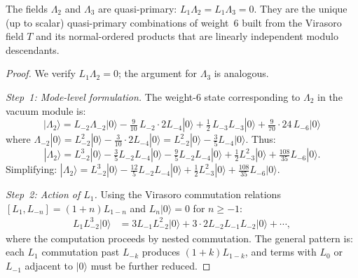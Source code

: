 \begin{proposition}\label{prop:lambda23-quasiprimary}
The fields $\Lambda_2$ and $\Lambda_3$ are quasi-primary:
$L_1\Lambda_2 = L_1\Lambda_3 = 0$.  They are the unique (up to
scalar) quasi-primary combinations of weight~$6$ built from the
Virasoro field $T$ and its normal-ordered products that are linearly
independent modulo descendants.
\end{proposition}

\begin{proof}
We verify $L_1\Lambda_2 = 0$; the argument for $\Lambda_3$ is
analogous.

\emph{Step~1: Mode-level formulation.}
The weight-6 state corresponding to $\Lambda_2$ in the vacuum
module is:
\[
|\Lambda_2\rangle = L_{-2}\Lambda_{-2}|0\rangle
  - \tfrac{9}{10}\, L_{-2}\cdot 2L_{-4}|0\rangle
  + \tfrac{1}{2}\, L_{-3}L_{-3}|0\rangle
  + \tfrac{9}{70}\cdot 24\, L_{-6}|0\rangle
\]
where $\Lambda_{-2}|0\rangle = L_{-2}^2|0\rangle
- \frac{3}{10}\cdot 2L_{-4}|0\rangle = L_{-2}^2|0\rangle
- \frac{3}{5}L_{-4}|0\rangle$.
Thus:
\[
|\Lambda_2\rangle = L_{-2}^3|0\rangle - \tfrac{3}{5}L_{-2}L_{-4}|0\rangle
  - \tfrac{9}{5}L_{-2}L_{-4}|0\rangle
  + \tfrac{1}{2}L_{-3}^2|0\rangle + \tfrac{108}{35}L_{-6}|0\rangle.
\]
Simplifying: $|\Lambda_2\rangle = L_{-2}^3|0\rangle
  - \tfrac{12}{5}L_{-2}L_{-4}|0\rangle + \tfrac{1}{2}L_{-3}^2|0\rangle
  + \tfrac{108}{35}L_{-6}|0\rangle$.

\emph{Step~2: Action of $L_1$.}
Using the Virasoro commutation relations
$[L_1, L_{-n}] = (1+n)L_{1-n}$ and
$L_n|0\rangle = 0$ for $n \geq -1$:
\begin{align}
L_1 L_{-2}^3|0\rangle &= 3L_{-1}L_{-2}^2|0\rangle
  + 3 \cdot 2 L_{-2}L_{-1}L_{-2}|0\rangle + \cdots, \nonumber
\end{align}
where the computation proceeds by nested commutation.
The general pattern is: each $L_1$ commutation past $L_{-k}$
produces $(1+k)L_{1-k}$, and terms with $L_0$ or $L_{-1}$
adjacent to $|0\rangle$ must be further reduced.


\end{proof}
